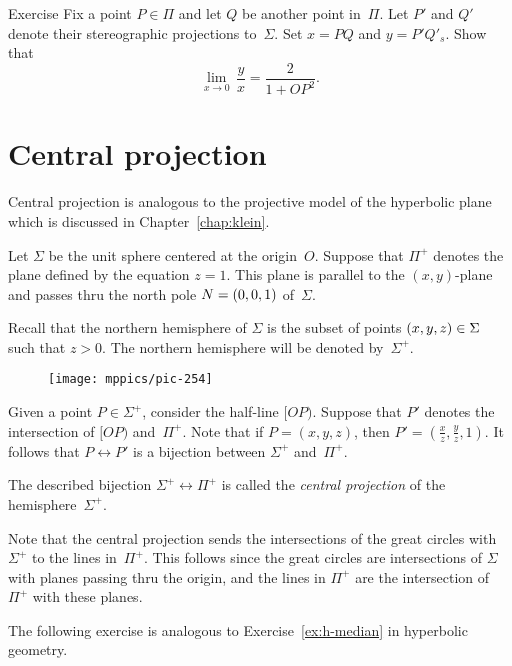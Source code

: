 \begin{thm}{Exercise}\label{ex:conform-sphere}
Fix a point $P\in \Pi$  and let $Q$ be another point in~$\Pi$.
Let $P'$ and $Q'$ denote their stereographic projections to~$\Sigma$.
Set $x=PQ$ and $y=P'Q'_s$.
Show that
$$\lim_{x\to 0}\, \frac{y}{x}=\frac{2}{1+OP^2}.$$
\end{thm}



\section{Central projection}

Central projection is analogous to the projective model of the hyperbolic plane which is discussed in Chapter~\ref{chap:klein}.

Let $\Sigma$ be the unit sphere centered at the origin~$O$.
Suppose that $\Pi^+$ denotes the plane defined by the equation $z=1$.
This plane is parallel to the $(x,y)$-plane and passes thru 
the north pole $N=(0,0,1)$ of~$\Sigma$.

Recall that the northern hemisphere of $\Sigma$
is the subset of points $(x,y,z)\in \Sigma$ such that $z>0$.
The northern  hemisphere will be denoted by~$\Sigma^+$.

\begin{wrapfigure}{o}{40mm}
\centering
\vskip-0mm
\texttt{[image: mppics/pic-254]}
\end{wrapfigure}

Given a point $P\in \Sigma^+$, consider the half-line $[OP)$. 
Suppose that $P'$ denotes the intersection of $[OP)$ and~$\Pi^+$.
Note that 
if $P=(x,y,z)$, then $P'=(\tfrac xz,\tfrac yz,1)$.
It follows that $P\leftrightarrow P'$ is a bijection between $\Sigma^+$ and~$\Pi^+$.



The described bijection $\Sigma^+\leftrightarrow \Pi^+$ is called the \emph{central projection} of 
the hemisphere~$\Sigma^+$.

Note that the central projection sends the intersections of the great circles with $\Sigma^+$ to the lines in~$\Pi^+$.
This follows since the great circles are intersections of $\Sigma$ with planes passing thru the origin,
and the lines in $\Pi^+$ are the intersection of $\Pi^+$ with these planes.

The following exercise 
is analogous to Exercise~\ref{ex:h-median}
in hyperbolic geometry.


